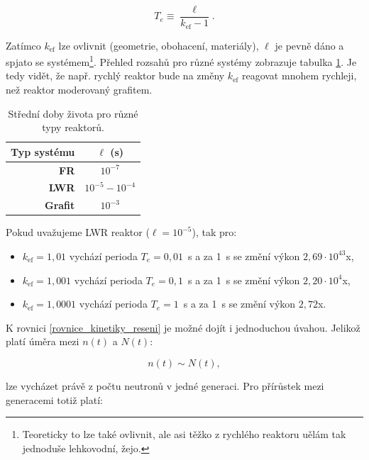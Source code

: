 \begin{equation}
  \boxed{
  T_e \equiv \dfrac{\ell}{k_{\text{ef}} - 1}.
  \label{perioda}}
\end{equation}

Zatímco $k_{\text{ef}}$ lze ovlivnit (geometrie, obohacení, materiály), $\ell$ je pevně dáno a spjato se systémem\footnote{Teoreticky to lze také ovlivnit, ale asi těžko z rychlého reaktoru uělám tak jednoduše lehkovodní, žejo.}. Přehled rozsahů pro různé systémy zobrazuje tabulka \ref{table_stredni_doby_zivota}. Je tedy vidět, že např. rychlý reaktor bude na změny $k_{\text{ef}}$ reagovat mnohem rychleji, než reaktor moderovaný grafitem.\\

\begin{table}[H]
\small
\centering
\caption{\small Střední doby života pro různé typy reaktorů.}
\label{table_stredni_doby_zivota}
\begin{tabular}{@{}rc@{}}
\toprule
\textbf{Typ systému} & $\ell$ (s)           \\ \midrule
\textbf{FR}          & $10^{-7}$            \\
\textbf{LWR}         & $10^{-5} - 10^{-4}$  \\
\textbf{Grafit}      & $10^{-3}$            \\ \bottomrule
\end{tabular}
\end{table}

Pokud uvažujeme LWR reaktor ($\ell = 10^{-5}$), tak pro:

\begin{itemize}
  \item $k_{\text{ef}} = 1,01$ vychází perioda $T_e = 0,01$~s a za 1~s se změní výkon $2,69 \cdot 10^{43}$x,
  \item $k_{\text{ef}} = 1,001$ vychází perioda $T_e = 0,1$~s a za 1~s se změní výkon $2,20 \cdot 10^{4}$x,
  \item $k_{\text{ef}} = 1,0001$ vychází perioda $T_e = 1$~s a za 1~s se změní výkon $2,72$x.
\end{itemize}

\normalsize

K rovnici \eqref{rovnice_kinetiky_reseni} je možné dojít i jednoduchou úvahou. Jelikož platí úměra mezi $n(t)$ a $N(t)$:

$$ n(t) \sim N(t), $$

lze vycházet právě z počtu neutronů v jedné generaci. Pro přírůstek mezi generacemi totiž platí:

